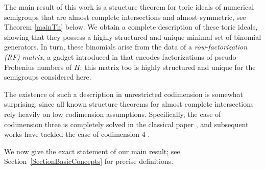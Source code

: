 \documentclass[11pt,twoside]{amsart}
\theoremstyle{definition}
\numberwithin{equation}{section}
\begin{document}
The main result of this work is a structure theorem for  toric ideals of   numerical semigroups that are 
 almost complete intersections and almost symmetric, see Theorem \ref{mainTh} below.
We obtain  a complete description of these toric ideals,  
showing that they possess a highly structured and unique minimal set of binomial generators.
In turn, 
these binomials arise from the data of a \emph{row-factorization (RF) matrix}, 
a gadget introduced in \cite{Mo} that  encodes factorizations of pseudo-Frobenius numbers of $H$;
this matrix too is highly structured and unique for the semigroups considered here.

The existence of such a description in unrestricted codimension is somewhat surprising, since
 all known 
 structure theorems for almost complete intersections rely heavily on low  codimension assumptions.
Specifically, the  case of codimension three is  completely solved in the classical paper \cite{BE}, and subsequent works have tackled the case of codimension 4 \cite{Kustin, Kustin93,Palmer}. 

We now give the exact statement of our main result;
see Section~\ref{SectionBasicConcepts} for precise definitions.
\end{document}
